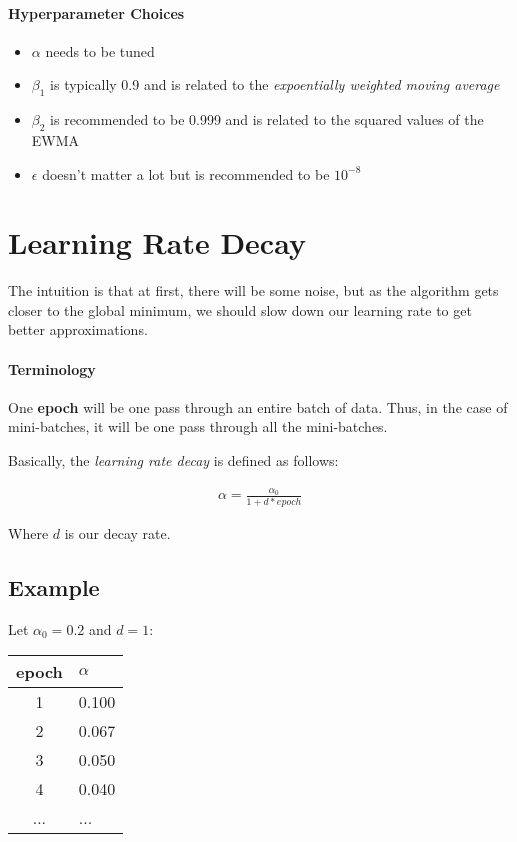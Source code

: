 \documentclass{article}
\begin{document}
\paragraph{Hyperparameter Choices}

\begin{itemize}
\item $\alpha$ needs to be tuned
\item $\beta_1$ is typically 0.9 and is related to the \textit{expoentially weighted moving average}
\item $\beta_2$ is recommended to be 0.999 and is related to the squared values of the EWMA
\item $\epsilon$ doesn't matter a lot but is recommended to be $10^{-8}$
\end{itemize}

\section{Learning Rate Decay}

The intuition is that at first, there will be some noise, but as the algorithm gets closer to the global minimum, we should slow down our learning rate to get better approximations.

\paragraph{Terminology}

One \textbf{epoch} will be one pass through an entire batch of data.  Thus, in the case of mini-batches, it will be one pass through all the mini-batches.

Basically, the \textit{learning rate decay} is defined as follows:

\begin{align}
\alpha = \frac{\alpha_0}{1 + d * epoch}
\end{align}

Where $d$ is our decay rate.

\subsection{Example}

Let $\alpha_0 = 0.2$ and $d = 1$:

\begin{tabular}{c | l}
epoch & $\alpha$ \\ \hline
1 & 0.100 \\
2 & 0.067 \\
3 & 0.050 \\
4 & 0.040 \\
... & ...
\end{tabular}
\end{document}
